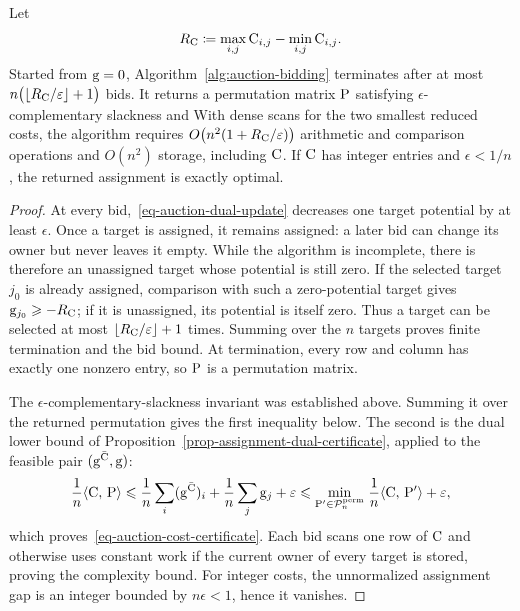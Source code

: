 \begin{prop}\label{prop-auction-termination}
	Let
	\[
		R_\C\eqdef\max_{i,j}\C_{i,j}-\min_{i,j}\C_{i,j}.
	\]
	Started from $\gD=0$, Algorithm~\ref{alg:auction-bidding} terminates after at most
	\(
		n\bigl(\lfloor R_\C/\epsilon\rfloor+1\bigr)
	\)
	bids. It returns a permutation matrix $\P$ satisfying $\epsilon$-complementary slackness and
	With dense scans for the two smallest reduced costs, the algorithm requires
	\(
		O\bigl(n^2(1+R_\C/\epsilon)\bigr)
	\)
	arithmetic and comparison operations and $O(n^2)$ storage, including $\C$. If $\C$ has integer entries and $\epsilon<1/n$, the returned assignment is exactly optimal.
\end{prop}
\begin{proof}
	At every bid,~\eqref{eq-auction-dual-update} decreases one target potential by at least $\epsilon$. Once a target is assigned, it remains assigned: a later bid can change its owner but never leaves it empty. While the algorithm is incomplete, there is therefore an unassigned target whose potential is still zero. If the selected target $j_0$ is already assigned, comparison with such a zero-potential target gives $\gD_{j_0}\geq-R_\C$; if it is unassigned, its potential is itself zero. Thus a target can be selected at most $\lfloor R_\C/\epsilon\rfloor+1$ times. Summing over the $n$ targets proves finite termination and the bid bound. At termination, every row and column has exactly one nonzero entry, so $\P$ is a permutation matrix.

	The $\epsilon$-complementary-slackness invariant was established above. Summing it over the returned permutation gives the first inequality below. The second is the dual lower bound of Proposition~\ref{prop-assignment-dual-certificate}, applied to the feasible pair $(\gD^{\bar\C},\gD)$:
	\[
		\frac1n\dotp{\C}{\P}
		\leq
		\frac1n\sum_i(\gD^{\bar\C})_i
		+
		\frac1n\sum_j\gD_j
		+
		\epsilon
		\leq
		\umin{\P'\in\mathcal P_n^{\mathrm{perm}}}
		\frac1n\dotp{\C}{\P'}
		+
		\epsilon,
	\]
	which proves~\eqref{eq-auction-cost-certificate}. Each bid scans one row of $\C$ and otherwise uses constant work if the current owner of every target is stored, proving the complexity bound. For integer costs, the unnormalized assignment gap is an integer bounded by $n\epsilon<1$, hence it vanishes.
\end{proof}

